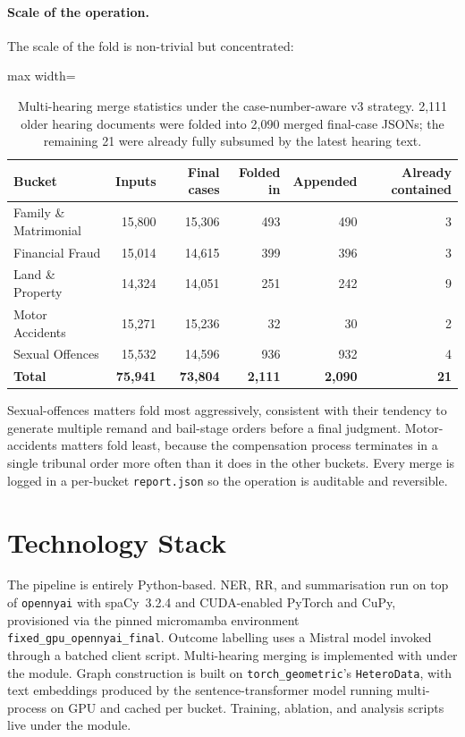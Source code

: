 \paragraph{Scale of the operation.}
The scale of the fold is non-trivial but concentrated:

\begin{table}[H]
  \centering
  \small
  \begin{adjustbox}{max width=\textwidth}
  \begin{tabular}{lrrrrr}
    \toprule
    Bucket & Inputs & Final cases & Folded in & Appended & Already contained \\
    \midrule
    Family \& Matrimonial & 15{,}800 & 15{,}306 & 493 & 490 & 3 \\
    Financial Fraud & 15{,}014 & 14{,}615 & 399 & 396 & 3 \\
    Land \& Property & 14{,}324 & 14{,}051 & 251 & 242 & 9 \\
    Motor Accidents & 15{,}271 & 15{,}236 & 32 & 30 & 2 \\
    Sexual Offences & 15{,}532 & 14{,}596 & 936 & 932 & 4 \\
    \midrule
    \textbf{Total} & \textbf{75{,}941} & \textbf{73{,}804} & \textbf{2{,}111}
      & \textbf{2{,}090} & \textbf{21} \\
    \bottomrule
  \end{tabular}
  \end{adjustbox}
  \caption{Multi-hearing merge statistics under the case-number-aware v3
  strategy. 2{,}111 older hearing documents were folded into 2{,}090 merged
  final-case JSONs; the remaining 21 were already fully subsumed by the latest
  hearing text.}
  \label{tab:merge_stats}
\end{table}

Sexual-offences matters fold most aggressively, consistent with their tendency to
generate multiple remand and bail-stage orders before a final judgment.
Motor-accidents matters fold least, because the compensation process terminates
in a single tribunal order more often than it does in the other buckets. Every
merge is logged in a per-bucket \texttt{report.json} so the operation is
auditable and reversible.

\section{Technology Stack}

The pipeline is entirely Python-based. NER, RR, and summarisation run
on top of \texttt{opennyai} with spaCy~3.2.4 and CUDA-enabled PyTorch
and CuPy, provisioned via the pinned micromamba environment
\texttt{fixed\_gpu\_opennyai\_final}. Outcome labelling uses a Mistral
model invoked through a batched client script. Multi-hearing merging is implemented with 
under the  module. Graph construction is built
on \texttt{torch\_geometric}'s \texttt{HeteroData}, with text
embeddings produced by the  sentence-transformer
model running multi-process on GPU and cached per bucket. Training,
ablation, and analysis scripts live under the 
module.
